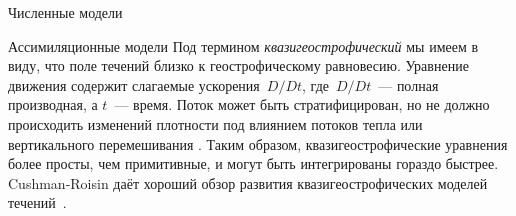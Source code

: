 \begin{chapter}{Численные модели}
\begin{section}{Ассимиляционные модели}
Под термином \emph{квазигеострофический} 
мы имеем в виду, что поле течений близко к геострофическому равновесию. 
Уравнение движения содержит слагаемые ускорения~$D/Dt$, 
где~$D/Dt$~--- полная производная, а $t$~--- время. 
Поток может быть стратифицирован, но не должно происходить
изменений плотности под влиянием потоков тепла 
или вертикального перемешивания%
. 
Таким образом, квазигеострофические уравнения более просты, чем 
примитивные, и могут быть интегрированы гораздо быстрее. 
Cushman-Roisin даёт хороший обзор развития
квазигеострофических моделей течений~\cite[стр.~204]{Cushman-Roisin:1994}.
%


\end{section}
\end{chapter}
